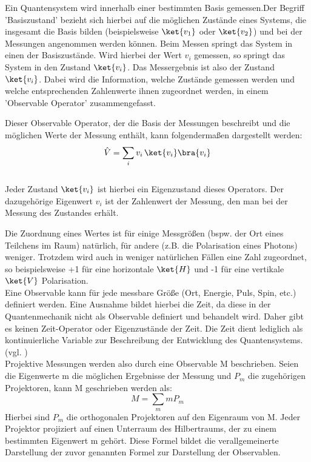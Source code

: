 Ein Quantensystem wird innerhalb einer bestimmten Basis gemessen.Der Begriff 'Basiszustand' bezieht sich hierbei auf die möglichen Zustände eines Systems, die insgesamt die Basis bilden (beispielsweise $\ket{v_1}$ oder $\ket{v_2}$) und bei der Messungen angenommen werden können.
Beim Messen springt das System in einen der Basiszustände. 
Wird hierbei der Wert $v_i$ gemessen, so springt das System in den Zustand $\ket{v_i}$. Das Messergebnis ist also der Zustand $\ket{v_i}$. 
Dabei wird die Information, welche Zustände gemessen werden und welche entsprechenden Zahlenwerte ihnen zugeordnet werden, in einem 'Observable Operator' zusammengefasst. 

Dieser Observable Operator, der die Basis der Messungen beschreibt und die möglichen Werte der Messung enthält, kann folgendermaßen dargestellt werden: 
\\
\begin{equation}
\hat{V} = \sum_i v_i \, \ket{v_i}\bra{v_i}
\end{equation}
\\ 
Jeder Zustand $\ket{v_i}$ ist hierbei ein Eigenzustand dieses Operators. Der dazugehörige Eigenwert $v_i$ ist der Zahlenwert der Messung, den man bei der Messung des Zustandes erhält. 

Die Zuordnung eines Wertes ist für einige Messgrößen (bspw. der Ort eines Teilchens im Raum) natürlich, für andere (z.B. die Polarisation eines Photons) weniger. Trotzdem wird auch in weniger natürlichen Fällen  eine Zahl zugeordnet, so beispielsweise +1 für eine horizontale $\ket{H}$ und -1 für eine vertikale $\ket{V}$ Polarisation. 
\\

Eine Observable kann für jede messbare Größe (Ort, Energie, Puls, Spin, etc.) definiert werden. Eine Ausnahme bildet hierbei die Zeit, da diese in der Quantenmechanik nicht als Observable definiert und behandelt wird.
Daher gibt es keinen Zeit-Operator oder Eigenzustände der Zeit. Die Zeit dient lediglich als kontinuierliche Variable zur Beschreibung der Entwicklung des Quantensystems. 
(vgl. \cite[Ch. 1.9.1]{lvovsky_quantum_2018})
\\

Projektive Messungen werden also durch eine Observable M beschrieben. Seien die Eigenwerte m die möglichen Ergebnisse der Messung und $P_m$ die zugehörigen Projektoren, kann M geschrieben werden als:
\begin{equation}
    M = \sum_m mP_m
\end{equation}
Hierbei sind $P_m$ die orthogonalen Projektoren auf den Eigenraum von M. Jeder Projektor projiziert auf einen Unterraum des Hilbertraums, der zu einem bestimmten Eigenwert m gehört. Diese Formel bildet die verallgemeinerte Darstellung der zuvor genannten Formel zur Darstellung der Observablen. \\ 

